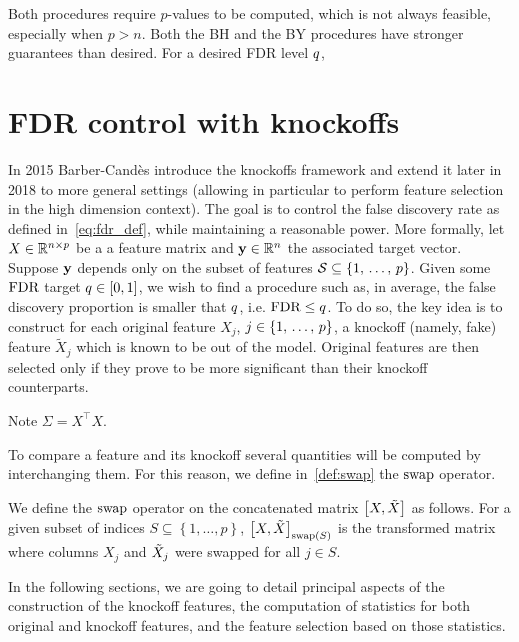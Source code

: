 Both procedures require $p$-values to be computed, which is not always feasible, especially when $p > n$.
Both the BH and the BY procedures have stronger guarantees than desired.
For a desired FDR level $q$,


\FloatBarrier
\section{FDR control with knockoffs}\label{sec:knockoffs}

In 2015 Barber-Candès introduce the knockoffs framework and extend it later in 2018 to more general settings
(allowing in particular to perform feature selection in the high dimension context).
The goal is to control the false discovery rate as defined in~\ref{eq:fdr_def}, while maintaining a reasonable power.
More formally, let $X \in \mathbb{R}^{n \times p}$ be a a feature matrix and $\mathbf{y} \in \mathbb{R}^n$ the associated target vector.
Suppose $\mathbf{y}$ depends only on the subset of features $\mathcal{S} \subseteq \left\{ 1,\, \dots,\, p \right\}$.
Given some $\text{FDR}$ target $q \in [0, 1]$, we wish to find a procedure such as, in average,
the false discovery proportion is smaller that $q$, i.e. $\text{FDR} \leq q$.
To do so, the key idea is to construct for each original feature $X_j$, $j \in \left\{ 1,\, \dots,\, p \right\}$,
a knockoff (namely, fake) feature $\tilde{X}_j$ which is known to be out of the model.
Original features are then selected only if they prove to be more significant than their knockoff counterparts.

Note $\Sigma = X^\top X$.

To compare a feature and its knockoff several quantities will be computed by interchanging them.
For this reason, we define in~\ref{def:swap} the $\operatorname{swap}$ operator.
\begin{definition}\label{def:swap}
    We define the $\operatorname{swap}$ operator on the concatenated matrix $\big[ X, \tilde{X} \big]$ as follows.
    For a given subset of indices $S \subseteq \left\{ 1, \dots, p \right\}$,
    $\big[ X, \tilde{X} \big]_{\operatorname{swap}(S)}$ is the transformed matrix where columns $X_j$ and $\tilde{X}_j$ were swapped for all
    $j \in S$.
\end{definition}

In the following sections, we are going to detail principal aspects of the construction of the knockoff features,
the computation of statistics for both original and knockoff features,
and the feature selection based on those statistics.

